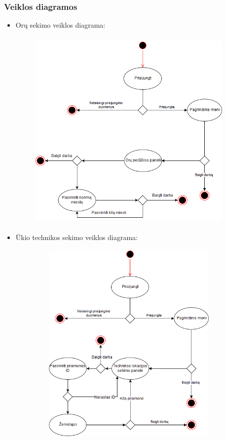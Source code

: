 \documentclass[oneside]{VUMIFPSkursinis}
\begin{document}
\subsubsection{Veiklos diagramos}
\begin{itemize}
\item Orų sekimo veiklos diagrama:
	\begin{figure}[H]
	\centering	
	\includegraphics[width=10cm,height=10cm,keepaspectratio]{veiklos_diagrama_orai.png}
	\caption{}
	\label{}
	\end{figure}
\item Ūkio technikos sekimo veiklos diagrama:
	\begin{figure}[H]
	\centering	
	\includegraphics[width=10cm,height=10cm,keepaspectratio]{veiklos_diagrama_technikos_sekimas.png}

\end{figure}
\end{itemize}
\end{document}
